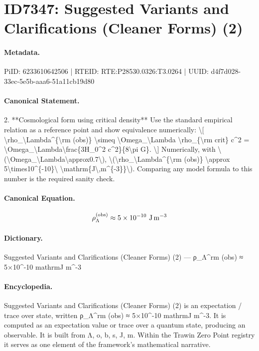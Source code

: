 \section*{ID7347: Suggested Variants and Clarifications (Cleaner Forms) (2)}
\paragraph{Metadata.}
PiID: 6233610642506 | RTEID: RTE:P28530.0326:T3.0264 | UUID: d4f7d028-33ec-5e5b-aaa6-51a11cb19d80

\paragraph{Canonical Statement.}
2. **Cosmological form using critical density** Use the standard empirical relation as a reference point and show equivalence numerically: \textbackslash{}[ \textbackslash{}rho\_\textbackslash{}Lambda\textasciicircum{}\{\textbackslash{}rm (obs)\} \textbackslash{}simeq \textbackslash{}Omega\_\textbackslash{}Lambda \textbackslash{}rho\_\{\textbackslash{}rm crit\} c\textasciicircum{}2 = \textbackslash{}Omega\_\textbackslash{}Lambda\textbackslash{}frac\{3H\_0\textasciicircum{}2 c\textasciicircum{}2\}\{8\textbackslash{}pi G\}. \textbackslash{}] Numerically, with \textbackslash{}(\textbackslash{}Omega\_\textbackslash{}Lambda\textbackslash{}approx0.7\textbackslash{}), \textbackslash{}(\textbackslash{}rho\_\textbackslash{}Lambda\textasciicircum{}\{\textbackslash{}rm (obs)\} \textbackslash{}approx 5\textbackslash{}times10\textasciicircum{}\{-10\}\textbackslash{} \textbackslash{}mathrm\{J\textbackslash{},m\textasciicircum{}\{-3\}\}\textbackslash{}). Comparing any model formula to this number is the required sanity check.

\paragraph{Canonical Equation.}
\[
\rho_\Lambda^{\rm (obs)} \approx 5\times10^{-10}\ \mathrm{J\,m^{-3}}
\]

\paragraph{Dictionary.}
Suggested Variants and Clarifications (Cleaner Forms) (2) — ρ\_Λ\textasciicircum{}rm (obs) ≈ 5×10\textasciicircum{}-10 mathrmJ m\textasciicircum{}-3

\paragraph{Encyclopedia.}
Suggested Variants and Clarifications (Cleaner Forms) (2) is an expectation / trace over state, written ρ\_Λ\textasciicircum{}rm (obs) ≈ 5×10\textasciicircum{}-10 mathrmJ m\textasciicircum{}-3. It is computed as an expectation value or trace over a quantum state, producing an observable. It is built from Λ, o, b, s, J, m. Within the Trawin Zero Point registry it serves as one element of the framework's mathematical narrative.
